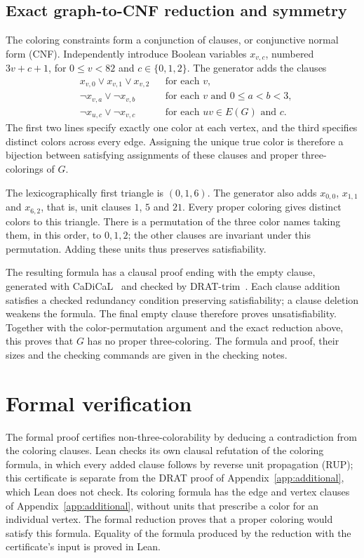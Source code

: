 \documentclass[11pt]{article}
\begin{document}
\begin{appendices}
\subsection{Exact graph-to-CNF reduction and symmetry}
The coloring constraints form a conjunction of clauses, or conjunctive
normal form (CNF).
Independently introduce Boolean variables $x_{v,c}$, numbered $3v+c+1$,
for $0\leq v<82$ and $c\in\{0,1,2\}$. The generator adds the clauses
\begin{align*}
 &x_{v,0}\lor x_{v,1}\lor x_{v,2}&&\text{for each }v,\\
 &\neg x_{v,a}\lor\neg x_{v,b}&&\text{for each }v\text{ and }0\leq a<b<3,\\
 &\neg x_{u,c}\lor\neg x_{v,c}&&\text{for each }uv\in E(G)\text{ and }c.
\end{align*}
The first two lines specify exactly one color at each vertex, and the
third specifies distinct colors across every edge. Assigning the unique
true color is therefore a bijection between satisfying assignments of
these clauses and proper three-colorings of $G$.

The lexicographically first triangle is $(0,1,6)$. The generator also
adds $x_{0,0}$, $x_{1,1}$ and $x_{6,2}$, that is, unit clauses $1$, $5$
and $21$. Every proper coloring gives distinct colors to this triangle.
There is a permutation of the three color names taking them, in this
order, to $0,1,2$; the other clauses are invariant under this permutation.
Adding these units thus preserves satisfiability.

The resulting formula has a clausal proof ending with the empty clause,
generated with CaDiCaL~\cite{cadical} and checked by DRAT-trim~\cite{drat}.
Each clause addition satisfies a checked redundancy condition preserving
satisfiability; a clause deletion weakens the formula. The final empty
clause therefore proves unsatisfiability. Together with the color-permutation
argument and the exact reduction above, this proves that $G$ has no proper
three-coloring. The formula and proof, their sizes and the checking commands
are given in the checking notes.

\section{Formal verification}\label{sec:replay}
The formal proof certifies non-three-colorability by deducing a
contradiction from the coloring clauses. Lean checks its own clausal
refutation of the coloring formula, in which every added clause follows
by reverse unit propagation (RUP); this certificate is separate from the
DRAT proof of Appendix~\ref{app:additional}, which Lean does not check.
Its coloring formula has the
edge and vertex clauses of Appendix~\ref{app:additional}, without units
that prescribe a color for an individual vertex. The formal
reduction proves that a proper coloring would satisfy this formula.
Equality of the formula produced by the reduction with the certificate's
input is proved in Lean.


\end{appendices}
\end{document}
